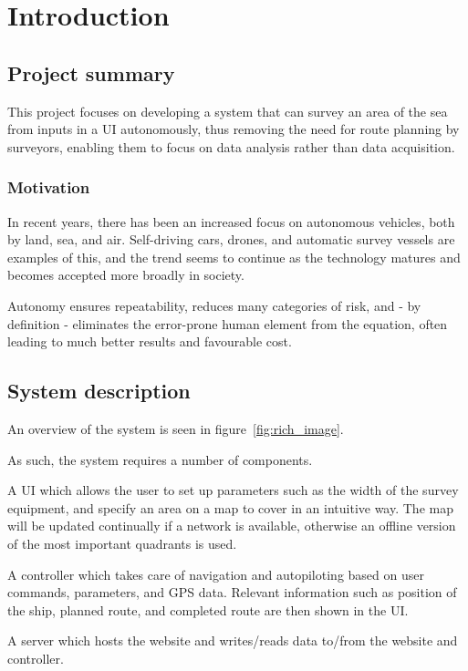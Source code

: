 \chapter{Introduction}

\section{Project summary}
This project focuses on developing a system that can survey an area of the sea from inputs in a UI autonomously, thus removing the need for route planning by surveyors, enabling them to focus on data analysis rather than data acquisition. 

\subsection{Motivation}
In recent years, there has been an increased focus on autonomous vehicles, both by land, sea, and air. Self-driving cars, drones, and automatic survey vessels are examples of this, and the trend seems to continue as the technology matures and becomes accepted more broadly in society.

Autonomy ensures repeatability, reduces many categories of risk, and - by definition - eliminates the error-prone human element from the equation, often leading to much better results and favourable cost.
 
\section{System description}

An overview of the system is seen in figure~\ref{fig:rich_image}.

As such, the system requires a number of components. 

A UI which allows the user to set up parameters such as the width of the survey equipment, and specify an area on a map to cover in an intuitive way. The map will be updated continually if a network is available, otherwise an offline version of the most important quadrants is used.

A controller which takes care of navigation and autopiloting based on user commands, parameters, and GPS data. Relevant information such as position of the ship, planned route, and completed route are then shown in the UI.

A server which hosts the website and writes/reads data to/from the website and controller.


